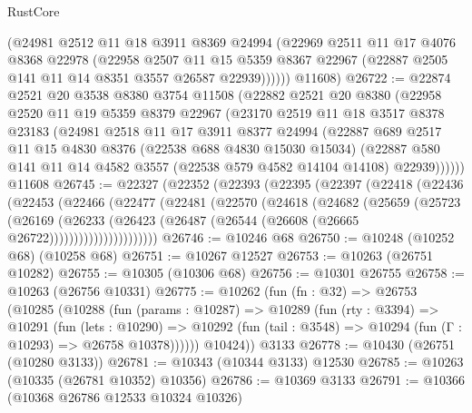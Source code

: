 \begin{lexlean}{RustCore}
\begin{coremodule}
          (@24981
            @2512
            @11
            @18
            @3911
            @8369
            @24994
            (@22969
              @2511
              @11
              @17
              @4076
              @8368
              @22978
              (@22958
                @2507
                @11
                @15
                @5359
                @8367
                @22967
                (@22887 @2505 @141 @11 @14 @8351 @3557 @26587 @22939))))))
      @11608)
@26722 := @22874
    @2521
    @20
    @3538
    @8380
    @3754
    @11508
    (@22882
      @2521
      @20
      @8380
      (@22958
        @2520
        @11
        @19
        @5359
        @8379
        @22967
        (@23170
          @2519
          @11
          @18
          @3517
          @8378
          @23183
          (@24981
            @2518
            @11
            @17
            @3911
            @8377
            @24994
            (@22887
              @689
              @2517
              @11
              @15
              @4830
              @8376
              (@22538 @688 @4830 @15030 @15034)
              (@22887 @580 @141 @11 @14 @4582 @3557 (@22538 @579 @4582 @14104 @14108) @22939))))))
    @11608
@26745 := @22327
    (@22352
      (@22393
        (@22395
          (@22397
            (@22418
              (@22436
                (@22453
                  (@22466
                    (@22477
                      (@22481
                        (@22570
                          (@24618
                            (@24682
                              (@25659
                                (@25723
                                  (@26169
                                    (@26233
                                      (@26423
                                        (@26487 (@26544 (@26608 (@26665 @26722))))))))))))))))))))))
@26746 := @10246 @68
@26750 := @10248 (@10252 @68) (@10258 @68)
@26751 := @10267 @12527
@26753 := @10263 (@26751 @10282)
@26755 := @10305 (@10306 @68)
@26756 := @10301 @26755
@26758 := @10263 (@26756 @10331)
@26775 := @10262
    (fun (fn : @32) =>
    @26753
      (@10285
        (@10288
          (fun (params : @10287) =>
          @10289
            (fun (rty : @3394) =>
            @10291
              (fun (lets : @10290) =>
              @10292 (fun (tail : @3548) => @10294 (fun (Γ : @10293) => @26758 @10378))))))
        @10424))
    @3133
@26778 := @10430 (@26751 (@10280 @3133))
@26781 := @10343 (@10344 @3133) @12530
@26785 := @10263 (@10335 (@26781 @10352) @10356)
@26786 := @10369 @3133
@26791 := @10366 (@10368 @26786 @12533 @10324 @10326)

\end{coremodule}
\end{lexlean}
